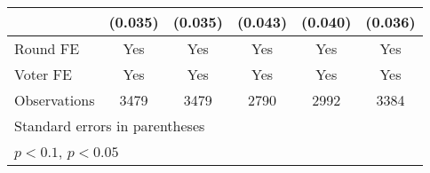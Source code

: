 \begin{table}[htbp]
\begin{tabular}{l*{5}{c}}
                    &     (0.035)       &     (0.035)       &     (0.043)       &     (0.040)       &     (0.036)       \\
[1em]
\hline  Round FE    &         Yes       &         Yes       &         Yes       &         Yes       &         Yes       \\
[1em]
Voter FE            &         Yes       &         Yes       &         Yes       &         Yes       &         Yes       \\
\hline
Observations        &        3479       &        3479       &        2790       &        2992       &        3384       \\
\hline\hline
\multicolumn{6}{l}{\footnotesize Standard errors in parentheses}\\
\multicolumn{6}{l}{\footnotesize \sym{+} \(p<0.1\), \sym{*} \(p<0.05\)}\\
\end{tabular}
\end{table}

